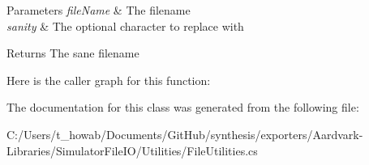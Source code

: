 \begin{DoxyParams}{Parameters}
{\em file\+Name} & The filename\\
\hline
{\em sanity} & The optional character to replace with\\
\hline
\end{DoxyParams}
\begin{DoxyReturn}{Returns}
The sane filename
\end{DoxyReturn}
Here is the caller graph for this function\+:


The documentation for this class was generated from the following file\+:\begin{DoxyCompactItemize}
\item 
C\+:/\+Users/t\+\_\+howab/\+Documents/\+Git\+Hub/synthesis/exporters/\+Aardvark-\/\+Libraries/\+Simulator\+File\+I\+O/\+Utilities/File\+Utilities.\+cs\end{DoxyCompactItemize}
